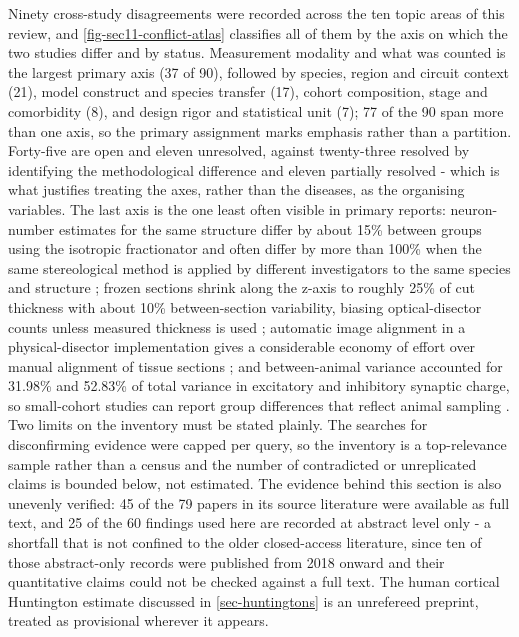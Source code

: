 \documentclass[11pt]{article}
\begin{document}
Ninety cross-study disagreements were recorded across the ten topic areas of this review, and \ref{fig-sec11-conflict-atlas} classifies all of them by the axis on which the two studies differ and by status. Measurement modality and what was counted is the largest primary axis (37 of 90), followed by species, region and circuit context (21), model construct and species transfer (17), cohort composition, stage and comorbidity (8), and design rigor and statistical unit (7); 77 of the 90 span more than one axis, so the primary assignment marks emphasis rather than a partition. Forty-five are open and eleven unresolved, against twenty-three resolved by identifying the methodological difference and eleven partially resolved - which is what justifies treating the axes, rather than the diseases, as the organising variables. The last axis is the one least often visible in primary reports: neuron-number estimates for the same structure differ by about 15\% between groups using the isotropic fractionator and often differ by more than 100\% when the same stereological method is applied by different investigators to the same species and structure \citep{HerculanoHouzel2015}; frozen sections shrink along the z-axis to roughly 25\% of cut thickness with about 10\% between-section variability, biasing optical-disector counts unless measured thickness is used \citep{Carlo2011}; automatic image alignment in a physical-disector implementation gives a considerable economy of effort over manual alignment of tissue sections \citep{Fabricius2017}; and between-animal variance accounted for 31.98\% and 52.83\% of total variance in excitatory and inhibitory synaptic charge, so small-cohort studies can report group differences that reflect animal sampling \citep{Chen2018}. Two limits on the inventory must be stated plainly. The searches for disconfirming evidence were capped per query, so the inventory is a top-relevance sample rather than a census and the number of contradicted or unreplicated claims is bounded below, not estimated. The evidence behind this section is also unevenly verified: 45 of the 79 papers in its source literature were available as full text, and 25 of the 60 findings used here are recorded at abstract level only - a shortfall that is not confined to the older closed-access literature, since ten of those abstract-only records were published from 2018 onward and their quantitative claims could not be checked against a full text. The human cortical Huntington estimate discussed in \ref{sec-huntingtons} is an unrefereed preprint, treated as provisional wherever it appears.
\end{document}
